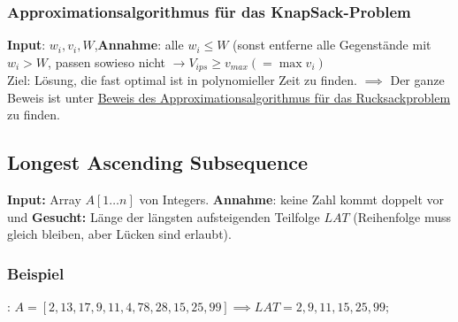 \documentclass[a4paper]{article}
\begin{document}
\subsubsection{Approximationsalgorithmus für das KnapSack-Problem}
\textbf{Input}: $w_i, v_i, W$,\textbf{Annahme}: alle $w_i \leq W$ (sonst entferne alle Gegenstände mit $w_i > W$, passen sowieso nicht $\rightarrow V_{ips} \geq v_{max} (=\max v_i)$\\
Ziel: Lösung, die fast optimal ist in polynomieller Zeit zu finden. $\implies$ Der ganze Beweis ist unter \href{https://cadmo.ethz.ch/education/lectures/HS23/DA/lectures/AD23-08.pdf}{Beweis des Approximationsalgorithmus für das Rucksackproblem} zu finden.

\subsection{Longest Ascending Subsequence}
\textbf{Input:} Array $A[1\dots n]$ von Integers. \textbf{Annahme}: keine Zahl kommt doppelt vor und \textbf{Gesucht:} Länge der längsten aufsteigenden Teilfolge $LAT$ (Reihenfolge muss gleich bleiben, aber Lücken sind erlaubt).
\subsubsection*{Beispiel}:
$A =  [2, 13, 17, 9, 11, 4, 78, 28, 15, 25, 99] \implies LAT = 2, 9, 11, 15, 25, 99;$ 
\end{document}
